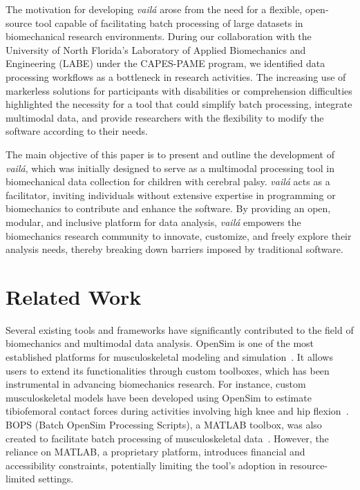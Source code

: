 \documentclass{article}
\begin{document}
The motivation for developing \textit{vailá} arose from the need for a flexible, open-source tool capable of facilitating batch processing of large datasets in biomechanical research environments. During our collaboration with the University of North Florida’s Laboratory of Applied Biomechanics and Engineering (LABE) under the CAPES-PAME program, we identified data processing workflows as a bottleneck in research activities. The increasing use of markerless solutions for participants with disabilities or comprehension difficulties highlighted the necessity for a tool that could simplify batch processing, integrate multimodal data, and provide researchers with the flexibility to modify the software according to their needs.

The main objective of this paper is to present and outline the development of \textit{vailá}, which was initially designed to serve as a multimodal processing tool in biomechanical data collection for children with cerebral palsy. \textit{vailá} acts as a facilitator, inviting individuals without extensive expertise in programming or biomechanics to contribute and enhance the software. By providing an open, modular, and inclusive platform for data analysis, \textit{vailá} empowers the biomechanics research community to innovate, customize, and freely explore their analysis needs, thereby breaking down barriers imposed by traditional software.

\section{Related Work}

Several existing tools and frameworks have significantly contributed to the field of biomechanics and multimodal data analysis. OpenSim is one of the most established platforms for musculoskeletal modeling and simulation~\citep{seth2018opensim}. It allows users to extend its functionalities through custom toolboxes, which has been instrumental in advancing biomechanics research. For instance, custom musculoskeletal models have been developed using OpenSim to estimate tibiofemoral contact forces during activities involving high knee and hip flexion~\citep{bedo2020custom}. BOPS (Batch OpenSim Processing Scripts), a MATLAB toolbox, was also created to facilitate batch processing of musculoskeletal data~\citep{bedo2020474}. However, the reliance on MATLAB, a proprietary platform, introduces financial and accessibility constraints, potentially limiting the tool's adoption in resource-limited settings.
\end{document}
